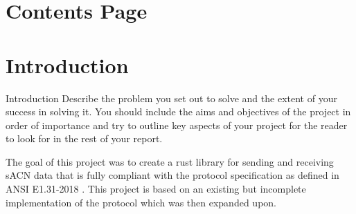 \documentclass[11pt,a4paper,notitlepage]{report}
\begin{document}
	\section{Contents Page}
	\tableofcontents
	
	\section{Introduction}
		Introduction
		Describe the problem you set out to solve and the
		extent of your success in solving it. You should include
		the aims and objectives of the project in order of
		importance and try to outline key aspects of your
		project for the reader to look for in the rest of your
		report.
		
	The goal of this project was to create a rust library for sending and receiving sACN data that is fully compliant with the protocol specification as defined in ANSI E1.31-2018 \cite{ANSI_E1.31}. This project is based on an existing but incomplete implementation of the protocol \cite{ORIGNIAL_IMPL} which was then expanded upon.\\
	
\end{document}
